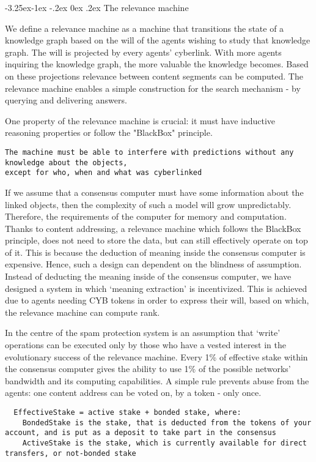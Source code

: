 \documentclass[8pt,oneside]{amsart}
\makeatletter
\renewcommand\subsection{\@startsection{subsection}{2}{\z@}%
                                     {-3.25ex\@plus -1ex \@minus -.2ex}%
                                     {0ex \@plus .2ex}%
                                     {\play\Large}}%
\newcommand{\titleSection}[1]{\subsection{#1}}
\makeatother
\begin{document}
\begin{Abstract}
\titleSection{The relevance machine}\label{The relevance-machine}

We define a relevance machine as a machine that transitions the state of a knowledge graph based on the will of the agents wishing to study that knowledge graph. The will is projected by every agents' cyberlink. With more agents inquiring the knowledge graph, the more valuable the knowledge becomes. Based on these projections relevance between content segments can be computed. The relevance machine enables a simple construction for the search mechanism - by querying and delivering answers.

One property of the relevance machine is crucial: it must have inductive reasoning properties or follow the "BlackBox" principle.

\begin{lstlisting}
The machine must be able to interfere with predictions without any knowledge about the objects,
except for who, when and what was cyberlinked
\end{lstlisting}

If we assume that a consensus computer must have some information about the linked objects, then the complexity of such a model will grow unpredictably. Therefore, the requirements of the computer for memory and computation. Thanks to content addressing, a relevance machine which follows the BlackBox principle, does not need to store the data, but can still effectively operate on top of it. This is because the deduction of meaning inside the consensus computer is expensive. Hence, such a design can dependent on the blindness of assumption. Instead of deducting the meaning inside of the consensus computer, we have designed a system in which ‘meaning extraction’ is incentivized. This is achieved due to agents needing CYB tokens in order to express their will, based on which, the relevance machine can compute rank.

In the centre of the spam protection system is an assumption that ‘write’ operations can be executed only by those who have a vested interest in the evolutionary success of the relevance machine. Every 1\% of effective stake within the consensus computer gives the ability to use 1\% of the possible networks' bandwidth and its computing capabilities. A simple rule prevents abuse from the agents: one content address can be voted on, by a token - only once.

\begin{lstlisting}
  EffectiveStake = active stake + bonded stake, where:
    BondedStake is the stake, that is deducted from the tokens of your account, and is put as a deposit to take part in the consensus
    ActiveStake is the stake, which is currently available for direct transfers, or not-bonded stake
\end{lstlisting}


\end{Abstract}
\end{document}
